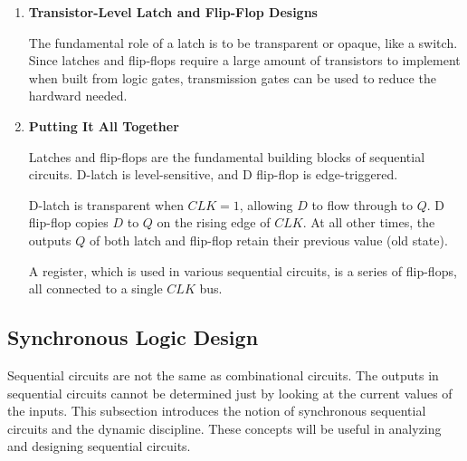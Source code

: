 \documentclass[12pt]{article}
\begin{document}
\begin{enumerate}
  \item \textbf{Transistor-Level Latch and Flip-Flop Designs}

  The fundamental role of a latch is to be transparent or opaque, like a switch. Since latches and flip-flops require a large amount of transistors to implement when built from logic gates, transmission gates can be used to reduce the hardward needed.

  \item \textbf{Putting It All Together}

  Latches and flip-flops are the fundamental building blocks of sequential circuits. D-latch is level-sensitive, and D flip-flop is edge-triggered.

  D-latch is transparent when $CLK = 1$, allowing $D$ to flow through to $Q$. D flip-flop copies $D$ to $Q$ on the rising edge of $CLK$. At all other times, the outputs $Q$ of both latch and flip-flop retain their previous value (old state).

  A register, which is used in various sequential circuits, is a series of flip-flops, all connected to a single $CLK$ bus.
\end{enumerate}

\subsection{Synchronous Logic Design}

Sequential circuits are not the same as combinational circuits. The outputs in sequential circuits cannot be determined just by looking at the current values of the inputs. This subsection introduces the notion of synchronous sequential circuits and the dynamic discipline. These concepts will be useful in analyzing and designing sequential circuits.
\end{document}
